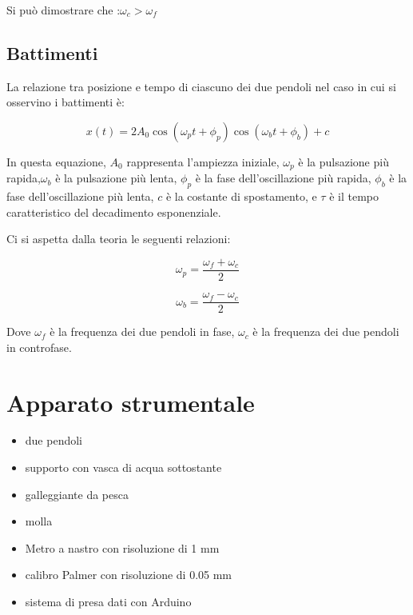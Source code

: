 \documentclass{article}
\begin{document}
                 Si può dimostrare che :$\omega_c > \omega_f$
                 
            \subsection{  Battimenti}
                 La relazione tra posizione e tempo di ciascuno dei due pendoli nel caso in cui si osservino i battimenti è:
                 
 \begin{equation}
x(t) = 2A_0 \cos(\omega_p t + \phi_p) \cos(\omega_b t + \phi_b) + c
\label{eq:bat}
\end{equation}

In questa equazione,  $A_0$  rappresenta l'ampiezza iniziale, $\omega_p$  è la pulsazione più rapida,$ \omega_b$  è la pulsazione più lenta, $\phi_p$  è la fase dell'oscillazione più rapida, $\phi_b$  è la fase dell'oscillazione più lenta, $c$  è la costante di spostamento, e $\tau$  è il tempo caratteristico del decadimento esponenziale.

Ci si aspetta dalla teoria le seguenti relazioni:

\begin{equation}
    \omega_p=\frac{\omega_f+\omega_c}{2}
    \label{eq:wp}
\end{equation}

\begin{equation}
    \omega_b=\frac{\omega_f-\omega_c}{2}
    \label{eq:wb}
\end{equation}

Dove $\omega_f$ è la frequenza dei due pendoli in  fase, $\omega_c$ è la frequenza dei due pendoli in  controfase.


\section{Apparato strumentale}

			\begin{itemize}
                          \item due pendoli 
                          \item supporto con vasca di acqua sottostante
					   \item galleggiante da pesca 
					   \item molla 
					   \item Metro a nastro con risoluzione di 1 mm 
					   \item calibro Palmer con risoluzione di 0.05 mm
					   \item sistema di presa dati con Arduino
			\end{itemize}
\end{document}
